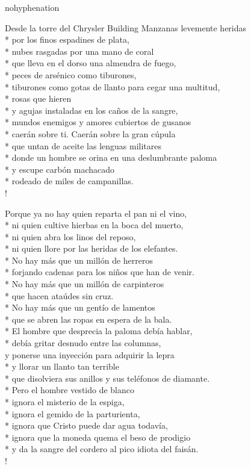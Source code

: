 \documentclass[
    a5paper,
    DIV=10,
    12pt,
    notitlepage,
    oneside,]
{scrbook} %
\begin{document}
\begin{hyphenrules}{nohyphenation}
\begin{poem}{Desde la torre del Chrysler Building}{}{\vspace{-1em}}
Manzanas levemente heridas\\*
por los finos espadines de plata,\\*
nubes rasgadas por una mano de coral\\*
que lleva en el dorso una almendra de fuego,\\*
peces de arsénico como tiburones,\\*
tiburones como gotas de llanto para cegar una multitud,\\*
rosas que hieren\\*
y agujas instaladas en los caños de la sangre,\\*
mundos enemigos y amores cubiertos de gusanos\\*
caerán sobre ti. Caerán sobre la gran cúpula\\*
que untan de aceite las lenguas militares\\*
donde un hombre se orina en una deslumbrante paloma\\*
y escupe carbón machacado\\*
rodeado de miles de campanillas.\\!

Porque ya no hay quien reparta el pan ni el vino,\\*
ni quien cultive hierbas en la boca del muerto,\\*
ni quien abra los linos del reposo,\\*
ni quien llore por las heridas de los elefantes.\\*
No hay más que un millón de herreros\\*
forjando cadenas para los niños que han de venir.\\*
No hay más que un millón de carpinteros\\*
que hacen ataúdes sin cruz.\\*
No hay más que un gentío de lamentos\\*
que se abren las ropas en espera de la bala.\\*
El hombre que desprecia la paloma debía hablar,\\*
debía gritar desnudo entre las columnas,\\

y ponerse una inyección para adquirir la lepra\\*
y llorar un llanto tan terrible\\*
que disolviera sus anillos y sus teléfonos de diamante.\\*
Pero el hombre vestido de blanco\\*
ignora el misterio de la espiga,\\*
ignora el gemido de la parturienta,\\*
ignora que Cristo puede dar agua todavía,\\*
ignora que la moneda quema el beso de prodigio\\*
y da la sangre del cordero al pico idiota del faisán.\\!


\end{poem}
\end{hyphenrules}
\end{document}
